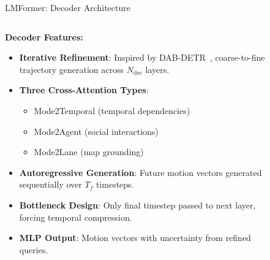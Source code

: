\documentclass[10pt,aspectratio=169]{beamer}
\begin{document}
\begin{frame}{LMFormer: Decoder Architecture}
    \begin{columns}[T]
        \begin{column}{0.5\textwidth}
            \textbf{Decoder Features:}
            \begin{itemize}
                \item \textbf{Iterative Refinement}: Inspired by DAB-DETR~\cite{liu2022dabdetr}, coarse-to-fine trajectory generation across \(N_{\text{dec}}\) layers.
                \item \textbf{Three Cross-Attention Types}:
                    \begin{itemize}
                        \item Mode2Temporal (temporal dependencies)
                        \item Mode2Agent (social interactions)
                        \item Mode2Lane (map grounding)
                    \end{itemize}
                \item \textbf{Autoregressive Generation}: Future motion vectors generated sequentially over \(T_f\) timesteps.
                \item \textbf{Bottleneck Design}: Only final timestep passed to next layer, forcing temporal compression.
                \item \textbf{MLP Output}: Motion vectors with uncertainty from refined queries.
            \end{itemize}
        \end{column}
        \begin{column}{0.5\textwidth}
            \begin{figure}

\end{figure}
\end{column}
\end{columns}
\end{frame}
\end{document}
